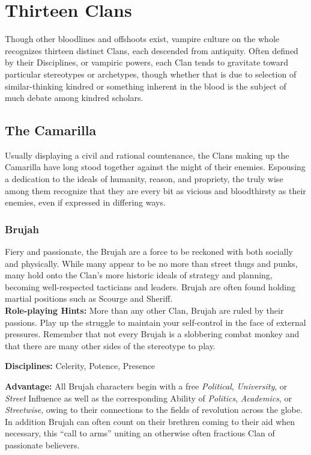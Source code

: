 \section{Thirteen Clans}
\label{sec:clans}
Though other bloodlines and offshoots exist, vampire culture on the whole 
recognizes thirteen distinct Clans, each descended from antiquity.  Often 
defined by their Disciplines, or vampiric powers, each Clan tends to 
gravitate toward particular stereotypes or archetypes, though whether that 
is due to selection of similar-thinking kindred or something inherent in the 
blood is the subject of much debate among kindred scholars.

\subsection{The Camarilla}
Usually displaying a civil and rational countenance, the Clans making up the 
Camarilla have long stood together against the might of their enemies.  
Espousing a dedication to the ideals of humanity, reason, and propriety, 
the truly wise among them recognize that they are every bit as vicious and 
bloodthirsty as their enemies, even if expressed in differing ways.

\subsubsection{Brujah}
Fiery and passionate, the Brujah are a force to be reckoned with both socially 
and physically.  While many appear to be no more than street thugs and punks, 
many hold onto the Clan's more historic ideals of strategy and planning, becoming 
well-respected tacticians and leaders.  Brujah are often found holding martial 
positions such as Scourge and Sheriff. \\

\textbf{Role-playing Hints:} More than any other Clan, Brujah are ruled by their 
passions.  Play up the struggle to maintain your self-control in the face of 
external pressures.  Remember that not every Brujah is a slobbering combat monkey 
and that there are many other sides of the stereotype to play.

\textbf{Disciplines:}  Celerity, Potence, Presence

\textbf{Advantage:}  All Brujah characters begin with a free \emph{Political}, 
\emph{University}, or \emph{Street} Influence as well as the corresponding 
Ability of \emph{Politics}, \emph{Academics}, or \emph{Streetwise}, owing to 
their connections to the fields of revolution across the globe.  In addition 
Brujah can often count on their brethren coming to their aid when necessary, 
this ``call to arms'' uniting an otherwise often fractious Clan of passionate 
believers.

